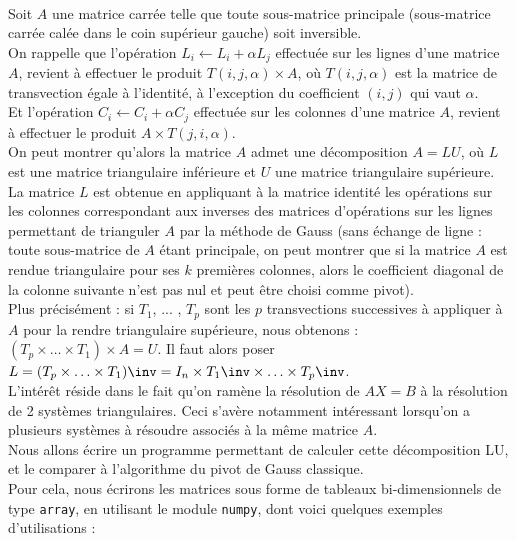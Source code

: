 \exer{[SYS-000]}
\setcounter{numques}{0}~\\

Soit $A$ une matrice carrée telle que toute sous-matrice principale (sous-matrice carrée calée dans 
le coin supérieur gauche) soit inversible.\\


On rappelle que l'opération $L_i \leftarrow L_i + \alpha L_j$ effectuée sur les lignes d'une 
matrice $A$, revient à effectuer le produit $T(i,j,\alpha)\times A$, où $T(i,j,\alpha)$ est la 
matrice de transvection égale à l'identité, à l'exception du coefficient $(i,j)$ qui vaut 
$\alpha$.\\


Et l'opération $C_i \leftarrow C_i + \alpha C_j$ effectuée sur les colonnes d'une matrice $A$, 
revient à effectuer le produit $A\times T(j,i,\alpha)$.\\
On peut montrer qu'alors la matrice $A$ admet une décomposition $A = LU$, où $L$ est une matrice 
triangulaire inférieure et $U$ une matrice triangulaire supérieure. La matrice $L$ est obtenue en 
appliquant à la matrice identité les opérations sur les colonnes correspondant aux inverses des 
matrices d'opérations sur les lignes permettant de trianguler $A$ par la méthode de Gauss (sans 
échange de ligne : toute sous-matrice de $A$ étant principale, on  peut montrer que si la 
matrice $A$ est rendue triangulaire pour ses $k$ premières colonnes, alors le coefficient 
diagonal de la colonne suivante n'est pas nul et peut être choisi comme pivot).\\
Plus précisément : si $T_1$, ... , $T_p$ sont les $p$ transvections successives à appliquer à $A$ 
pour la rendre triangulaire supérieure, nous obtenons : $(T_p\times \ldots \times T_1)\times A=U$. 
Il faut alors poser $L=(T_p\times \ldots\times T_1)\inv=I_n\times T_1\inv \times \ldots\times 
T_p\inv$.\\


L'intérêt réside dans le fait qu'on ramène la résolution de $AX = B$ à la résolution de 2 systèmes 
triangulaires. Ceci s'avère notamment intéressant lorsqu'on a plusieurs systèmes à résoudre 
associés 
à la même matrice $A$.\\


Nous allons écrire un programme permettant de calculer cette décomposition LU, et le comparer à 
l'algorithme du pivot de Gauss classique.\\
Pour cela, nous écrirons les matrices sous forme de tableaux bi-dimensionnels de type 
\texttt{array}, en utilisant le module \texttt{numpy}, dont voici quelques exemples 
d'utilisations :\\

